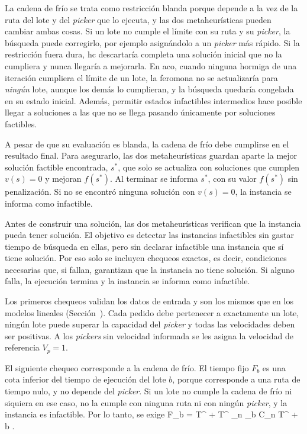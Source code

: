 La cadena de frío se trata como restricción blanda porque depende a la vez
de la ruta del lote y del {\em picker} que lo ejecuta, y las dos
metaheurísticas pueden cambiar ambas cosas. Si un lote no cumple el límite
con su ruta y su {\em picker}, la búsqueda puede corregirlo, por ejemplo
asignándolo a un {\em picker} más rápido. Si la restricción fuera dura,
\ac{hc} descartaría completa una solución inicial que no la cumpliera y nunca
llegaría a mejorarla. En \ac{aco}, cuando ninguna hormiga de una iteración
cumpliera el límite de un lote, la feromona no se actualizaría para
{\em ningún} lote, aunque los demás lo cumplieran, y la búsqueda quedaría
congelada en su estado inicial. Además, permitir estados infactibles
intermedios hace posible llegar a soluciones a las que no se llega pasando
únicamente por soluciones factibles.

A pesar de que su evaluación es blanda, la cadena de frío debe cumplirse en
el resultado final. Para asegurarlo, las dos metaheurísticas guardan aparte
la mejor solución factible encontrada, $s^*$, que solo se actualiza con
soluciones que cumplen $v(s) = 0$ y mejoran $f(s^*)$. Al terminar se informa
$s^*$, con su valor $f(s^*)$ sin penalización. Si no se encontró ninguna
solución con $v(s) = 0$, la instancia se informa como infactible.

\stopsubsection

\startsubsection[title={Verificación previa de factibilidad}, reference=sec:heur_verificacion]

Antes de construir una solución, las dos metaheurísticas verifican que la
instancia pueda tener solución. El objetivo es detectar las instancias
infactibles sin gastar tiempo de búsqueda en ellas, pero sin declarar
infactible una instancia que sí tiene solución. Por eso solo se incluyen
chequeos exactos, es decir, condiciones necesarias que, si fallan, garantizan
que la instancia no tiene solución. Si alguno falla, la ejecución termina y la instancia se
informa como infactible.

Los primeros chequeos validan los datos de entrada y son los mismos que en
los modelos lineales (Sección~). Cada pedido debe
pertenecer a exactamente un lote, ningún lote puede superar la capacidad del
{\em picker} y todas las velocidades deben ser positivas. A los {\em pickers} sin
velocidad informada se les asigna la velocidad de referencia $V_p = 1$.

El siguiente chequeo corresponde a la cadena de frío. El tiempo fijo $F_b$
es una cota inferior del tiempo de ejecución del lote $b$, porque corresponde
a una ruta de tiempo nulo, y no depende del {\em picker}. Si un lote no
cumple la cadena de frío ni siquiera en ese caso, no la cumple con ninguna
ruta ni con ningún {\em picker}, y la instancia es infactible. Por lo tanto,
se exige
\startplaceformula[reference=eq:hc_cota_frio]
\startformula
	F_b = T^{} + T^{} \sum_{n \in {}_b} C_n \;\leq\; T^{} + \varepsilon
	\qquad \forall b \in {}.
\stopformula
\stopplaceformula

